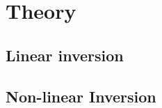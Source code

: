 \chapter{Theory}\label{chap:theory}
\minitoc
\vfill
{}

\section{Linear inversion}

\blindmathtrue
\blindmathpaper

\section{Non-linear Inversion}